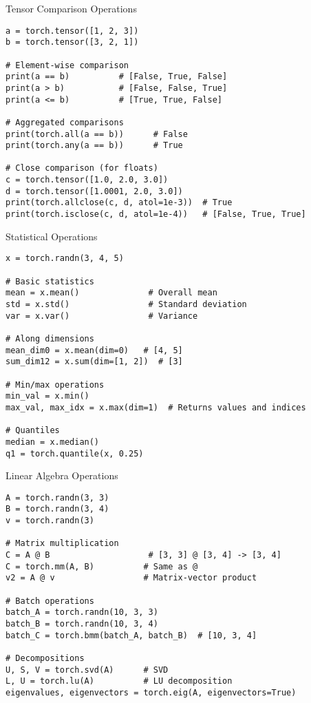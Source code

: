 \documentclass[aspectratio=169,10pt]{beamer}
\begin{document}
\begin{frame}[fragile]{Tensor Comparison Operations}
\begin{lstlisting}
a = torch.tensor([1, 2, 3])
b = torch.tensor([3, 2, 1])

# Element-wise comparison
print(a == b)          # [False, True, False]
print(a > b)           # [False, False, True]
print(a <= b)          # [True, True, False]

# Aggregated comparisons
print(torch.all(a == b))      # False
print(torch.any(a == b))      # True

# Close comparison (for floats)
c = torch.tensor([1.0, 2.0, 3.0])
d = torch.tensor([1.0001, 2.0, 3.0])
print(torch.allclose(c, d, atol=1e-3))  # True
print(torch.isclose(c, d, atol=1e-4))   # [False, True, True]
\end{lstlisting}
\end{frame}

\begin{frame}[fragile]{Statistical Operations}
\begin{lstlisting}
x = torch.randn(3, 4, 5)

# Basic statistics
mean = x.mean()              # Overall mean
std = x.std()                # Standard deviation
var = x.var()                # Variance

# Along dimensions
mean_dim0 = x.mean(dim=0)   # [4, 5]
sum_dim12 = x.sum(dim=[1, 2])  # [3]

# Min/max operations
min_val = x.min()
max_val, max_idx = x.max(dim=1)  # Returns values and indices

# Quantiles
median = x.median()
q1 = torch.quantile(x, 0.25)
\end{lstlisting}
\end{frame}

\begin{frame}[fragile]{Linear Algebra Operations}
\begin{lstlisting}
A = torch.randn(3, 3)
B = torch.randn(3, 4)
v = torch.randn(3)

# Matrix multiplication
C = A @ B                    # [3, 3] @ [3, 4] -> [3, 4]
C = torch.mm(A, B)          # Same as @
v2 = A @ v                  # Matrix-vector product

# Batch operations
batch_A = torch.randn(10, 3, 3)
batch_B = torch.randn(10, 3, 4)
batch_C = torch.bmm(batch_A, batch_B)  # [10, 3, 4]

# Decompositions
U, S, V = torch.svd(A)      # SVD
L, U = torch.lu(A)          # LU decomposition
eigenvalues, eigenvectors = torch.eig(A, eigenvectors=True)
\end{lstlisting}
\end{frame}
\end{document}
